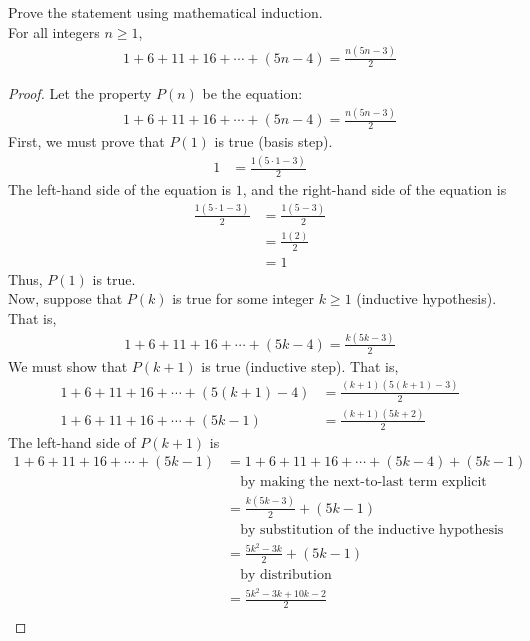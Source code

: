 \documentclass[name=Ojas\ Chaturvedi, emailid=oj.chaturvedi.2024, course=Capstone:\ Discrete\ Math, num=8, deadline={November\ 2,\ 2023}]{homework}
\begin{document}
Prove the statement using mathematical induction. \\
For all integers $n \geq 1$,
\begin{align*}
    1 + 6 + 11 + 16 + \cdots + (5n-4) = \frac{n(5n-3)}{2}
\end{align*}
\begin{proof}
    Let the property $P(n)$ be the equation:
    \begin{align*}
        1 + 6 + 11 + 16 + \cdots + (5n-4) = \frac{n(5n-3)}{2}
    \end{align*}
    First, we must prove that $P(1)$ is true (basis step).
    \begin{align*}
        1 &= \frac{1(5 \cdot 1-3)}{2}
    \end{align*}
    The left-hand side of the equation is $1$, and the right-hand side of the equation is
    \begin{align*}
        \frac{1(5 \cdot 1-3)}{2} &= \frac{1(5-3)}{2} \\
        &= \frac{1(2)}{2} \\
        &= 1
    \end{align*}
    Thus, $P(1)$ is true. \\
    Now, suppose that $P(k)$ is true for some integer $k \geq 1$ (inductive hypothesis). That is,
    \begin{align*}
        1 + 6 + 11 + 16 + \cdots + (5k-4) = \frac{k(5k-3)}{2}
    \end{align*}
    We must show that $P(k+1)$ is true (inductive step). That is,
    \begin{align*}
        1 + 6 + 11 + 16 + \cdots + (5(k+1)-4) &= \frac{(k+1)(5(k+1)-3)}{2} \\
        1 + 6 + 11 + 16 + \cdots + (5k-1) &= \frac{(k+1)(5k+2)}{2}
    \end{align*}
    The left-hand side of $P(k+1)$ is
    \begin{align*}
        1 + 6 + 11 + 16 + \cdots + (5k-1) & = 1 + 6 + 11 + 16 + \cdots + (5k-4) + (5k-1) \\
        & \quad \text{by making the next-to-last term explicit} \\
        &= \frac{k(5k-3)}{2} + (5k-1) \\
        & \quad \text{by substitution of the inductive hypothesis} \\
        &= \frac{5k^2-3k}{2} + (5k-1) \\
        & \quad \text{by distribution} \\
        &= \frac{5k^2-3k+10k-2}{2} \\

\end{align*}
\end{proof}
\end{document}
